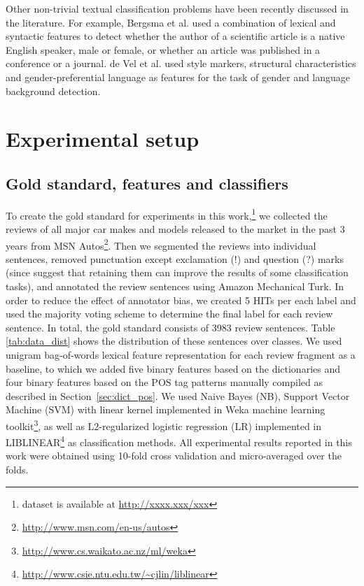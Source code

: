 \documentclass[runningheads,a4paper]{llncs}
\begin{document}
Other non-trivial textual classification problems have been recently discussed in the literature. For example, Bergsma et al. \cite{Bergsma2012Articles} used a combination of
lexical and syntactic features to detect whether the author of a scientific article is a native English speaker, male or female, or whether an article was published in a conference
or a journal. de Vel et al. \cite{deVel2002Gender} used style markers, structural characteristics and gender-preferential language as features for the task of gender and language
background detection.  

\section{Experimental setup}
\subsection{Gold standard, features and classifiers}

To create the gold standard for experiments in this work,\footnote{dataset is available at \url{http://xxxx.xxx/xxx}}
we collected the reviews of all major car makes and models released to the market in the past 3 years from  MSN Autos\footnote{\url{http://www.msn.com/en-us/autos}}. Then we
segmented the reviews into individual sentences, removed punctuation except exclamation (!) and question (?) marks (since \cite{Barbosa2010Robust}
suggest that retaining them can improve the results of some classification tasks), and annotated the review sentences using Amazon Mechanical Turk. In order to reduce the effect of
annotator bias, we created 5 HITs per each label and used the majority voting scheme to determine the final label for each review sentence. In total, the gold standard consists of
3983 review sentences. Table \ref{tab:data_dist} shows the distribution of these sentences over classes. We used unigram bag-of-words lexical feature representation for each
review fragment as a baseline, to which we added five binary features based on the dictionaries and four binary features based on the POS tag patterns manually compiled as
described in Section~\ref{sec:dict_pos}. We used Naive Bayes (NB), Support Vector Machine (SVM) with linear kernel implemented in Weka machine learning
toolkit\footnote{\url{http://www.cs.waikato.ac.nz/ml/weka}}, as well as L2-regularized logistic regression (LR) implemented in
LIBLINEAR\footnote{\url{http://www.csie.ntu.edu.tw/~cjlin/liblinear}}\cite{Fan2008Liblinear} as classification methods. All experimental results reported in this work were
obtained using 10-fold cross validation and micro-averaged over the folds.
\end{document}
